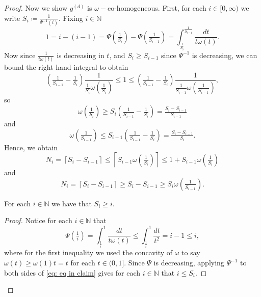 \documentclass[10pt,a4paper]{amsart}
\newcommand{\N}{\mathbb{N}}
\begin{document}
\begin{proof}
    Now we show $g^{(d)}$ is $\omega-$co-homogeneous. First, for each $i \in [0,\infty)$ we write $S_i \coloneqq \frac{1}{\Psi^{-1}(i)}.$ Fixing $i \in \N$
    \begin{equation*}
        1 = i-(i-1) = \Psi\left(\tfrac{1}{S_{i}}\right) - \Psi\left(\tfrac{1}{S_{i-1}}\right) = \int_{\frac{1}{S_i}}^{\frac{1}{S_{i-1}}}\frac{dt}{t\omega(t)}.
    \end{equation*}
    Now since $\frac{1}{t\omega(t)}$ is decreasing in $t$, and $S_i \geq S_{i-1}$ since $\Psi^{-1}$ is decreasing, we can bound the right-hand integral to obtain
    \begin{equation*}
        \left(\tfrac{1}{S_{i-1}}-\tfrac{1}{S_i}\right) \frac{1}{\frac{1}{S_i}\omega(\frac{1}{S_i})} \leq   1 \leq  \left(\tfrac{1}{S_{i-1}}-\tfrac{1}{S_i}\right) \frac{1}{\frac{1}{S_{i-1}}\omega(\frac{1}{S_{i-1}})},
    \end{equation*} so 
$$\omega\left(\tfrac{1}{S_i}\right) \geq S_i\left(\tfrac{1}{S_{i-1}}-\tfrac{1}{S_i}\right)  = \tfrac{S_i-S_{i-1}}{S_{i-1}}$$ and
$$\omega\left(\tfrac{1}{S_{i-1}}\right) \leq S_{i-1}\left(\tfrac{1}{S_{i-1}}-\tfrac{1}{S_i}\right) = \tfrac{S_i-S_{i-1}}{S_i}.$$
    Hence, we obtain 
\begin{equation}\label{eq: Si}
        N_i = \left\lceil S_i-S_{i-1}\right\rceil \leq \left\lceil S_{i-1}\omega\left(\tfrac{1}{S_i}\right)\right\rceil \leq 1+ S_{i-1}\omega\left(\tfrac{1}{S_i}\right)
    \end{equation} and
    \begin{equation}\label{eq: Si 2}
        N_i = \left\lceil S_i-S_{i-1}\right\rceil \geq  S_i-S_{i-1} \geq S_{i}\omega\left(\tfrac{1}{S_{i-1}}\right).
    \end{equation}
    \begin{claim}\label{claim: I}
       For each $i \in \N$ we have that
        $S_i \geq i.$
    \end{claim}
    \begin{proof}
Notice for each $i \in \N$ that
\begin{equation} \label{eq: eq in claim}
    \Psi\left(\tfrac{1}{i}\right) = \int_{\frac{1}{i}}^1 \frac{dt}{t\omega(t)} \leq \int_{\frac{1}{i}}^1 \frac{dt}{t^2} = i-1\leq i,
\end{equation}
 where for the first inequality we used the concavity of $\omega$ to say $\omega(t) \geq \omega(1)t = t$ for each $t \in (0,1].$ Since $\Psi$ is decreasing, applying $\Psi^{-1}$ to both sides of \eqref{eq: eq in claim} gives for each $i \in \N$ that $i\leq S_i.$
    \end{proof}

\end{proof}
\end{document}
